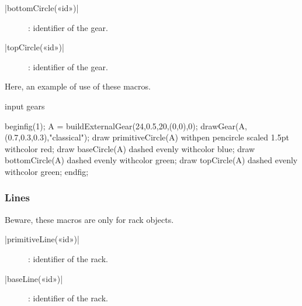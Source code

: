 \documentclass[english]{ltxdoc}
\begin{document}
\begin{colourband}
\commande|bottomCircle(«id»)|\smallskip{}
\begin{description}
  \item[]:  identifier of the gear. 
\end{description}
\end{colourband}

\begin{colourband}
\commande|topCircle(«id»)|\smallskip{}
\begin{description}
  \item[]:  identifier of the gear. 
\end{description}
\end{colourband}

Here, an example of use of these macros. 


\begin{ExempleMP}
input gears

beginfig(1);
A = buildExternalGear(24,0.5,20,(0,0),0);
drawGear(A,(0.7,0.3,0.3),"classical");
draw primitiveCircle(A) withpen pencircle scaled 1.5pt withcolor red;
draw baseCircle(A) dashed evenly  withcolor blue;
draw bottomCircle(A) dashed evenly  withcolor green;
draw topCircle(A) dashed evenly  withcolor green;
endfig;
\end{ExempleMP}

\subsubsection{Lines}

Beware, these macros are only for rack objects. 

\begin{colourband}
\commande|primitiveLine(«id»)|\smallskip{}
\begin{description}
  \item[]:  identifier of the rack. 
\end{description}
\end{colourband}

\begin{colourband}
\commande|baseLine(«id»)|\smallskip{}
\begin{description}
  \item[]:  identifier of the rack. 
\end{description}
\end{colourband}
\end{document}
